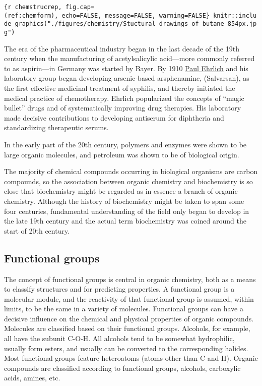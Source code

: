 \texttt{\{r\ chemstrucrep,\ fig.cap=\textquotesingle{}(ref:chemform)\textquotesingle{},\ echo=FALSE,\ message=FALSE,\ warning=FALSE\}\ knitr::include\_graphics("./figures/chemistry/Stuctural\_drawings\_of\_butane\_854px.jpg")}

The era of the pharmaceutical industry began in the last decade of the
19th century when the manufacturing of acetylsalicylic acid---more
commonly referred to as aspirin---in Germany was started by Bayer. By
1910 \href{https://en.wikipedia.org/wiki/Paul_Ehrlich}{Paul Ehrlich} and
his laboratory group began developing arsenic-based arsphenamine,
(Salvarsan), as the first effective medicinal treatment of syphilis, and
thereby initiated the medical practice of chemotherapy. Ehrlich
popularized the concepts of ``magic bullet'' drugs and of systematically
improving drug therapies. His laboratory made decisive contributions to
developing antiserum for diphtheria and standardizing therapeutic
serums.

In the early part of the 20th century, polymers and enzymes were shown
to be large organic molecules, and petroleum was shown to be of
biological origin.

The majority of chemical compounds occurring in biological organisms are
carbon compounds, so the association between organic chemistry and
biochemistry is so close that biochemistry might be regarded as in
essence a branch of organic chemistry. Although the history of
biochemistry might be taken to span some four centuries, fundamental
understanding of the field only began to develop in the late 19th
century and the actual term biochemistry was coined around the start of
20th century.

\hypertarget{functional-groups}{%
\subsection{Functional groups}\label{functional-groups}}

The concept of functional groups is central in organic chemistry, both
as a means to classify structures and for predicting properties. A
functional group is a molecular module, and the reactivity of that
functional group is assumed, within limits, to be the same in a variety
of molecules. Functional groups can have a decisive influence on the
chemical and physical properties of organic compounds. Molecules are
classified based on their functional groups. Alcohols, for example, all
have the subunit C-O-H. All alcohols tend to be somewhat hydrophilic,
usually form esters, and usually can be converted to the corresponding
halides. Most functional groups feature heteroatoms (atoms other than C
and H). Organic compounds are classified according to functional groups,
alcohols, carboxylic acids, amines, etc.

